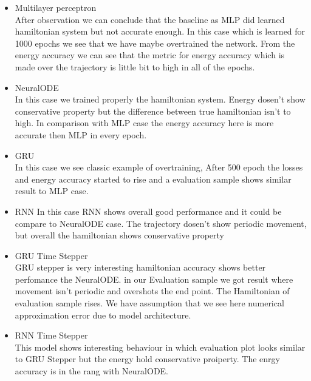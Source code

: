\begin{itemize}
	\item Multilayer perceptron\\
	After observation we can conclude that the baseline as MLP did learned hamiltonian system but not accurate enough. In this case which is learned for 1000 epochs we see that we have maybe overtrained the network. From the energy accuracy we can see that the metric for energy accuracy which is made over the trajectory is little bit to high in all of the epochs. 


	\item NeuralODE\\
	In this case we trained properly the hamiltonian system. Energy dosen't show conservative property but the difference between true hamiltonian isn't to high. In comparison with MLP case the energy accuracy here is more accurate then MLP in every epoch. 

	\item GRU\\
	In this case we see classic example of overtraining, After 500 epoch the losses and energy accuracy started to rise and a evaluation sample shows similar result to MLP case.

	\item RNN
	In this case RNN shows overall good performance and it could be compare to NeuralODE case. The trajectory dosen't show periodic movement, but overall the hamiltonian shows conservative property

	\item GRU Time Stepper\\
	GRU stepper is very interesting hamiltonian accuracy shows better perfomance the NeuralODE. in our Evaluation sample we got result where movement isn't periodic and overshots the end point. The Hamiltonian of evaluation sample rises. We have assumption that we see here numerical approximation error due to model architecture.  


	\item RNN Time Stepper\\
	This model shows interesting behaviour in which evaluation plot looks similar to GRU Stepper but the energy hold conservative proiperty.
	The enrgy accuracy is in the rang with NeuralODE.

\end{itemize}

